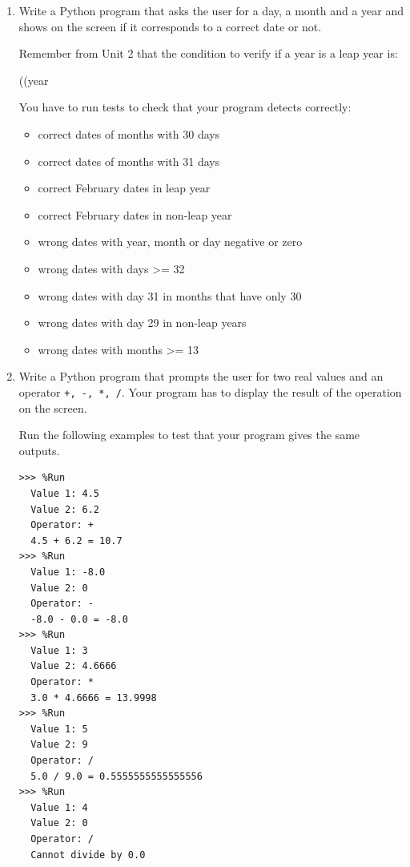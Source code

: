 \begin{enumerate}
\item Write a Python program that asks the user for a day, a month and a year and shows on the screen if it corresponds to a correct date or not.

Remember from Unit 2 that the condition to verify if a year is a leap year is:

\begin{python}
((year %
\end{python}

You have to run tests to check that your program detects correctly:

\begin{itemize}[nosep]
    \item correct dates of months with 30 days
    \item correct dates of months with 31 days
    \item correct February dates in leap year
    \item correct February dates in non-leap year
    \item wrong dates with year, month or day negative or zero
    \item wrong dates with days >= 32
    \item wrong dates with day 31 in months that have only 30
    \item wrong dates with day 29 in non-leap years
    \item wrong dates with months >= 13
    
\end{itemize}


\item Write a Python program that prompts the user for two real values and an operator \verb|+, -, *, /|. Your program has to display the result of the operation on the screen.

Run the following examples to test that your program gives the same outputs.

\begin{Verbatim}[frame=single, label={\em example test execution of the program}]
>>> %Run 
  Value 1: 4.5
  Value 2: 6.2
  Operator: +
  4.5 + 6.2 = 10.7
>>> %Run 
  Value 1: -8.0
  Value 2: 0
  Operator: -
  -8.0 - 0.0 = -8.0
>>> %Run 
  Value 1: 3
  Value 2: 4.6666
  Operator: *
  3.0 * 4.6666 = 13.9998
>>> %Run 
  Value 1: 5
  Value 2: 9
  Operator: /
  5.0 / 9.0 = 0.5555555555555556
>>> %Run 
  Value 1: 4
  Value 2: 0
  Operator: /
  Cannot divide by 0.0
\end{Verbatim}




\end{enumerate}
